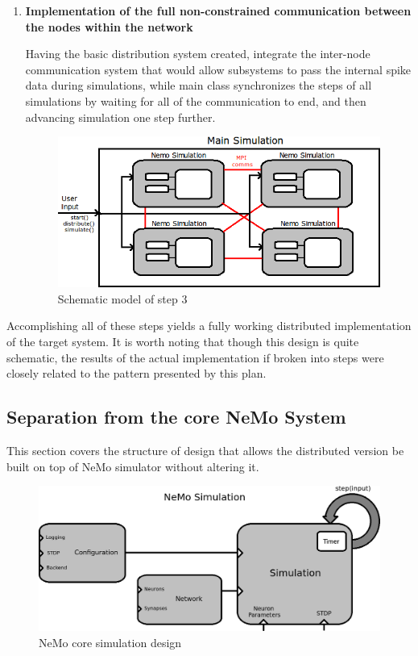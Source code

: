 \begin{enumerate}
\item{\textbf{Implementation of the full non-constrained communication between the nodes within the network}}

Having the basic distribution system created, integrate the inter-node communication system that would allow subsystems to pass the internal spike data during simulations, while main class synchronizes the steps of all simulations by waiting for all of the communication to end, and then advancing simulation one step further.

\begin{figure}[h!]
\begin{center}
\includegraphics[scale = 0.7]{images/design/design_stage_3.png}
\end{center}
\caption{Schematic model of step 3}
\end{figure}

\end{enumerate}

Accomplishing all of these steps yields a fully working distributed implementation of the target system. It is worth noting that though this design is quite schematic, the results of the actual implementation if broken into steps were closely related to the pattern presented by this plan.

\subsection{Separation from the core NeMo System}

This section covers the structure of design that allows the distributed version be built on top of NeMo simulator without altering it.

\begin{figure}[h!]
\begin{center}
\includegraphics[scale = 0.4]{images/design/core_simulation.png}
\end{center}
\caption{NeMo core simulation design}
\end{figure}

